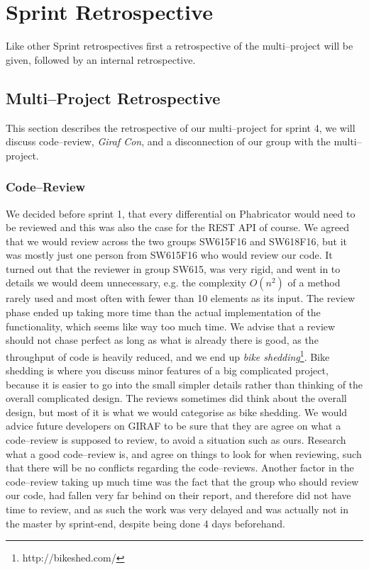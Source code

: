 \section{Sprint Retrospective}\label{sec:S4retro}

Like other Sprint retrospectives first a retrospective of the multi--project will be given, followed by an internal retrospective.

\subsection*{Multi--Project Retrospective}
This section describes the retrospective of our multi--project for sprint 4, we will discuss code--review, \textit{Giraf Con}, and a disconnection of our group with the multi--project.

\subsubsection*{Code--Review}
We decided before sprint 1, that every differential on Phabricator would need to be reviewed and this was also the case for the REST API of course.
We agreed that we would review across the two groups SW615F16 and SW618F16, but it was mostly just one person from SW615F16 who would review our code.
It turned out that the reviewer in group SW615, was very rigid, and went in to details we would deem unnecessary, e.g. the complexity $O(n^2)$ of a method rarely used and most often with fewer than 10 elements as its input.
The review phase ended up taking more time than the actual implementation of the functionality, which seems like way too much time.
We advise that a review should not chase perfect as long as what is already there is good, as the throughput of code is heavily reduced, and we end up \textit{bike shedding}\footnote{http://bikeshed.com/}.
Bike shedding is where you discuss minor features of a big complicated project, because it is easier to go into the small simpler details rather than thinking of the overall complicated design.
The reviews sometimes did think about the overall design, but most of it is what we would categorise as bike shedding.
We would advice future developers on GIRAF to be sure that they are agree on what a code--review is supposed to review, to avoid a situation such as ours.
Research what a good code--review is, and agree on things to look for when reviewing, such that there will be no conflicts regarding the code--reviews.
Another factor in the code--review taking up much time was the fact that the group who should review our code, had fallen very far behind on their report, and therefore did not have time to review, and as such the work was very delayed and was actually not in the master by sprint-end, despite being done 4 days beforehand.

